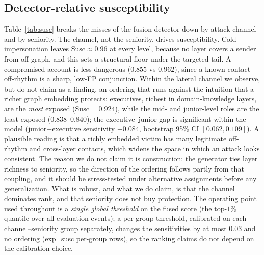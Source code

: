\documentclass[conference]{IEEEtran}
\begin{document}
\subsection{Detector-relative susceptibility}
\label{sec:susc}
Table~\ref{tab:susc} breaks the misses of the fusion detector down by attack channel and by seniority. The
channel, not the seniority, drives susceptibility. Cold impersonation leaves $\mathrm{Susc}\approx0.96$ at
every level, because no layer covers a sender from off-graph, and this sets a structural floor under the
targeted tail. A compromised account is less dangerous ($0.855$ vs $0.962$), since a known contact off-rhythm
is a sharp, low-FP conjunction. Within the lateral channel we observe, but do not claim as a finding, an
ordering that runs against the intuition that a richer graph embedding protects: executives, richest in
domain-knowledge layers, are the \emph{most} exposed ($\mathrm{Susc}=0.924$), while the mid- and junior-level
roles are the least exposed ($0.838$--$0.840$); the executive--junior gap is significant within the model
(junior$-$executive sensitivity $+0.084$, bootstrap 95\% CI $[0.062, 0.109]$). A plausible reading is that a
richly embedded victim has many legitimate off-rhythm and cross-layer contacts, which widens the space in which
an attack looks consistent. The reason we do not claim it is construction: the generator ties layer richness
to seniority, so the direction of the ordering follows partly from that coupling, and it should be
stress-tested under alternative assignments before any generalization. What is robust, and what we do claim,
is that the channel dominates rank, and that seniority does not buy protection. The operating point used
throughout is a \emph{single global threshold} on the fused score (the top-$1\%$ quantile over all
evaluation events); a per-group threshold, calibrated on each channel--seniority group separately, changes
the sensitivities by at most $0.03$ and no ordering (exp\_susc per-group rows), so the ranking claims do
not depend on the calibration choice.
\end{document}
